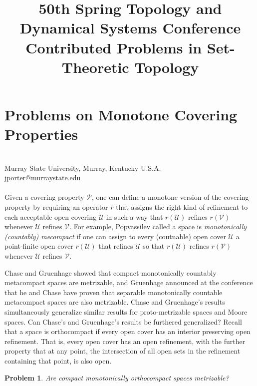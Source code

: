 \documentclass{amsart}
\newtheorem{problem}[theorem]{Problem}
\begin{document}
\title{50th Spring Topology and Dynamical Systems Conference \\ Contributed Problems in Set-Theoretic Topology}



\maketitle

\section{Problems on Monotone Covering Properties}

\\
Murray State University, Murray, Kentucky U.S.A.
\\
jporter@murraystate.edu
\\
\\

Given a covering property $\mathcal{P}$, one can define a monotone version of the covering
property by requiring an operator $r$ that assigns the right kind of refinement to each
acceptable open covering $\mathcal{U}$ in such a way that $r(\mathcal{U})$ refines $r(\mathcal{V})$ whenever $\mathcal{U}$ refines
$\mathcal{V}$. For example, Popvassilev \cite{P} called a space is {\em monotonically (countably) mecompact} if one can assign to every (coutnable) open
cover $\mathcal{U}$ a point-finite open cover $r(\mathcal{U})$ that refines $\mathcal{U}$ so that $r(\mathcal{U})$ refines $r(\mathcal{V})$ whenever
$\mathcal{U}$ refines $\mathcal{V}$.

Chase and Gruenhage \cite{CG} showed that compact monotonically countably metacompact spaces are metrizable, and Gruenhage announced at the conference that he and Chase \cite{CG2} have proven that separable monotonically countable metacompact spaces are also metrizable. Chase and Gruenhage's results simultaneously generalize similar results for proto-metrizable spaces and Moore spaces. Can Chase's and Gruenhage's results be furthered generalized? Recall that a space is orthocompact if every open cover has an interior preserving open refinement. That is, every open cover has an open refinement, with the further property that at any point, the intersection of all open sets in the refinement containing that point, is also open.

\begin{problem}\label{ortho} Are compact monotonically orthocompact spaces metrizable?
\end{problem}
\end{document}
